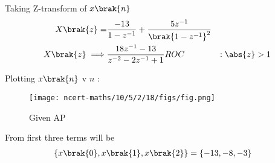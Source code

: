 \documentclass[journal,12pt,twocolumn]{IEEEtran}
\begin{document}
Taking Z-transform of $x\brak{n}$
\begin{align}
X\brak{z} = & \frac{-13}{1 - z^{-1}} + \frac{ 5z^{-1}}{\brak{1 - z^{-1}}^2}\\
X\brak{z}\implies & \frac{18z^{-1} - 13}{z^{-2} - 2z^{-1} + 1}
\notag ROC &: \abs{z} > 1 


\end{align}

\pagebreak

Plotting $x\brak{n}$ v $n$ :
\begin{figure}[h]
    \texttt{[image: ncert-maths/10/5/2/18/figs/fig.png]}
    \caption{Given AP}
    \label{fig:10.5.2.18.1}
\end{figure}

From  first three terms will be
\begin{align}
\{x\brak{0},x\brak{1},x\brak{2}\} &= \{-13 , -8 , -3\}
\end{align}
\end{document}

